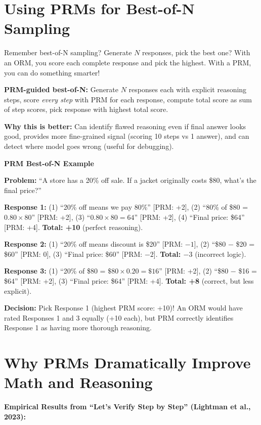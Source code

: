 \begin{chapterenv}
\section{Using PRMs for Best-of-N Sampling}

Remember best-of-N sampling? Generate $N$ responses, pick the best one? With an ORM, you score each complete response and pick the highest. With a PRM, you can do something smarter!

\textbf{PRM-guided best-of-N:} Generate $N$ responses each with explicit reasoning steps, score \textit{every step} with PRM for each response, compute total score as sum of step scores, pick response with highest total score.

\textbf{Why this is better:} Can identify flawed reasoning even if final answer looks good, provides more fine-grained signal (scoring 10 steps vs 1 answer), and can detect where model goes wrong (useful for debugging).

\textbf{PRM Best-of-N Example}

\textbf{Problem:} ``A store has a 20\% off sale. If a jacket originally costs \$80, what's the final price?''

\textbf{Response 1:} (1) ``20\% off means we pay 80\%'' [PRM: +2], (2) ``80\% of \$80 = $0.80 \times 80$'' [PRM: +2], (3) ``$0.80 \times 80 = 64$'' [PRM: +2], (4) ``Final price: \$64'' [PRM: +4]. \textbf{Total: +10} (perfect reasoning).

\textbf{Response 2:} (1) ``20\% off means discount is \$20'' [PRM: $-1$], (2) ``\$80 $-$ \$20 = \$60'' [PRM: 0], (3) ``Final price: \$60'' [PRM: $-2$]. \textbf{Total: $-3$} (incorrect logic).

\textbf{Response 3:} (1) ``20\% of \$80 = $\$80 \times 0.20 = \$16$'' [PRM: +2], (2) ``\$80 $-$ \$16 = \$64'' [PRM: +2], (3) ``Final price: \$64'' [PRM: +4]. \textbf{Total: +8} (correct, but less explicit).

\textbf{Decision:} Pick Response 1 (highest PRM score: +10)! An ORM would have rated Responses 1 and 3 equally (+10 each), but PRM correctly identifies Response 1 as having more thorough reasoning.

\section{Why PRMs Dramatically Improve Math and Reasoning}

\begin{infobox}
\textbf{Empirical Results from ``Let's Verify Step by Step'' (Lightman et al., 2023):}


\end{infobox}
\end{chapterenv}
